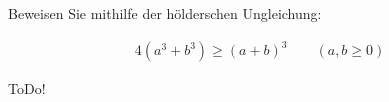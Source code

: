 
\begin{exercise}

Beweisen Sie mithilfe der hölderschen Ungleichung:

\begin{align*}
    4 (a^3 + b^3)
    \geq
    (a + b)^3
    \qquad
    (a, b \geq 0)
\end{align*}

\end{exercise}


\begin{solution}

ToDo!

\end{solution}

